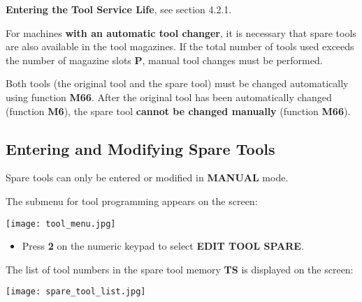 \textbf{Entering the Tool Service Life}, see section 4.2.1.

For machines \textbf{with an automatic tool changer}, it is necessary that spare tools are also available in the tool magazines.  
If the total number of tools used exceeds the number of magazine slots \textbf{P}, manual tool changes must be performed.

Both tools (the original tool and the spare tool) must be changed automatically using function \textbf{M66}.  
After the original tool has been automatically changed (function \textbf{M6}), the spare tool \textbf{cannot be changed manually} (function \textbf{M66}).

\newpage

\subsection{Entering and Modifying Spare Tools}

Spare tools can only be entered or modified in \textbf{MANUAL} mode.

\procedure

\begin{itemize}
    \vspace{.6cm}
    \vspace{.6cm}
\end{itemize}
\vspace{.5cm}

The submenu for tool programming appears on the screen:

\begin{center}
    \texttt{[image: tool\_menu.jpg]}
\end{center}

\begin{itemize}
    \item Press \textbf{2} on the numeric keypad to select \textbf{EDIT TOOL SPARE}.
\end{itemize}

\newpage

The list of tool numbers in the spare tool memory \textbf{TS} is displayed on the screen:

\begin{center}
    \texttt{[image: spare\_tool\_list.jpg]}
\end{center}

